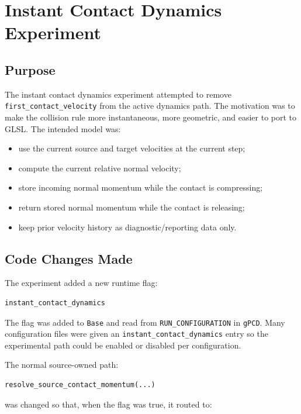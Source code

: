 \section{Instant Contact Dynamics Experiment}

\subsection{Purpose}

The instant contact dynamics experiment attempted to remove
\texttt{first\_contact\_velocity} from the active dynamics path.  The motivation
was to make the collision rule more instantaneous, more geometric, and easier to
port to GLSL.  The intended model was:

\begin{itemize}
    \item use the current source and target velocities at the current step;
    \item compute the current relative normal velocity;
    \item store incoming normal momentum while the contact is compressing;
    \item return stored normal momentum while the contact is releasing;
    \item keep prior velocity history as diagnostic/reporting data only.
\end{itemize}

\subsection{Code Changes Made}

The experiment added a new runtime flag:

\begin{verbatim}
instant_contact_dynamics
\end{verbatim}

The flag was added to \texttt{Base} and read from \texttt{RUN\_CONFIGURATION} in
\texttt{gPCD}.  Many configuration files were given an
\texttt{instant\_contact\_dynamics} entry so the experimental path could be
enabled or disabled per configuration.

The normal source-owned path:

\begin{verbatim}
resolve_source_contact_momentum(...)
\end{verbatim}

was changed so that, when the flag was true, it routed to:

